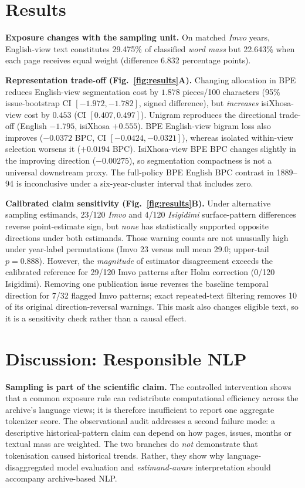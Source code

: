 \documentclass[10pt,letterpaper]{article}
\begin{document}
\section{Results}
\textbf{Exposure changes with the sampling unit.} On matched \emph{Imvo} years, English-view text constitutes 29.475\% of classified \emph{word mass} but 22.643\% when each page receives equal weight (difference 6.832 percentage points).

\textbf{Representation trade-off (Fig.~\ref{fig:results}A).} Changing allocation in BPE reduces English-view segmentation cost by \(1.878\) pieces/100 characters (95\% issue-bootstrap CI \([-1.972,-1.782]\), signed difference), but \emph{increases} isiXhosa-view cost by \(0.453\) (CI \([0.407,0.497]\)). Unigram reproduces the directional trade-off (English \(-1.795\), isiXhosa \(+0.555\)). BPE English-view bigram loss also improves (\(-0.0372\) BPC, CI \([-0.0424,-0.0321]\)), whereas isolated within-view selection worsens it (\(+0.0194\) BPC). IsiXhosa-view BPE BPC changes slightly in the improving direction (\(-0.00275\)), so segmentation compactness is not a universal downstream proxy. The full-policy BPE English BPC contrast in 1889--94 is inconclusive under a six-year-cluster interval that includes zero.

\textbf{Calibrated claim sensitivity (Fig.~\ref{fig:results}B).} Under alternative sampling estimands, 23/120 \emph{Imvo} and 4/120 \emph{Isigidimi} surface-pattern differences reverse point-estimate sign, but \emph{none} has statistically supported opposite directions under both estimands. Those warning counts are not unusually high under year-label permutations (Imvo 23 versus null mean 29.0; upper-tail \(p=0.888\)). However, the \emph{magnitude} of estimator disagreement exceeds the calibrated reference for 29/120 Imvo patterns after Holm correction (0/120 Isigidimi). Removing one publication issue reverses the baseline temporal direction for 7/32 flagged Imvo patterns; exact repeated-text filtering removes 10 of its original direction-reversal warnings. This mask also changes eligible text, so it is a sensitivity check rather than a causal effect.

\section{Discussion: Responsible NLP}
\textbf{Sampling is part of the scientific claim.} The controlled intervention shows that a common exposure rule can redistribute computational efficiency across the archive's language views; it is therefore insufficient to report one aggregate tokenizer score. The observational audit addresses a second failure mode: a descriptive historical-pattern claim can depend on how pages, issues, months or textual mass are weighted. The two branches do \emph{not} demonstrate that tokenisation caused historical trends. Rather, they show why language-disaggregated model evaluation and \emph{estimand-aware} interpretation should accompany archive-based NLP.
\end{document}
